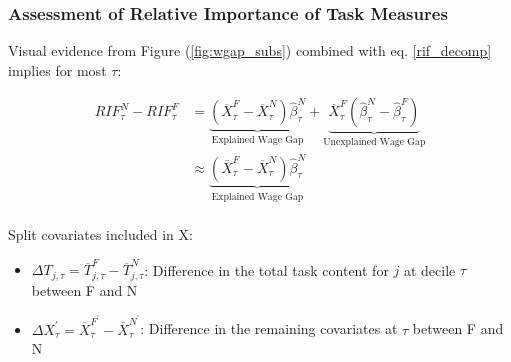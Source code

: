 \documentclass[10pt]{beamer}
\begin{document}
\begin{frame} 
	\frametitle{Assessment of Relative Importance of Task Measures}
	
	
	Visual evidence from Figure (\ref{fig:wgap_subs}) combined with eq. \eqref{rif_decomp} implies for most $\tau$: \\
	
	
	\begin{center}
		\begin{equation} \label{rif_decomp_mod}
		\begin{aligned}
		RIF_{\tau}^{N} - RIF_{\tau}^{F} &=  \underbrace{(\overline{X}_{\tau}^{F} - \overline{X}_{\tau}^{N}) \hat{\beta}_{\tau}^{N}}_\text{Explained Wage Gap} + \underbrace{\overline{X}_{\tau}^{F}(\hat{\beta}_{\tau}^{N} - \hat{\beta}_{\tau}^{F})}_\text{Unexplained Wage Gap}\\
		&\approx  \underbrace{(\overline{X}_{\tau}^{F} - \overline{X}_{\tau}^{N}) \hat{\beta}_{\tau}^{N}}_\text{Explained Wage Gap}\\ 
		\end{aligned}
		\end{equation} 
	\end{center}
	
	Split covariates included in X:
	
	\begin{itemize}
		\item $\Delta T_{j, \tau} = \overline{T}_{j, \tau}^{F} - \overline{T}_{j, \tau}^{N}$: Difference in the total task content for $j$ at decile $\tau$ between F and N 
		\item $\Delta X_{\tau}^{'} = \overline{X}_{\tau}^{F^{'}} - \overline{X}_{\tau}^{N^{'}}$: Difference in the remaining covariates at $\tau$ between F and N 
	\end{itemize}
	
\end{frame}
\end{document}
